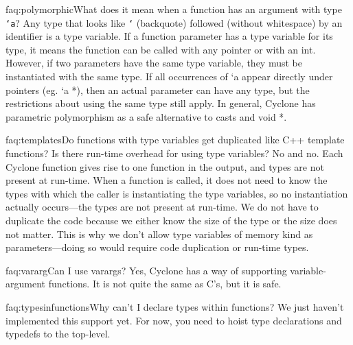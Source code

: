 \begin{faqa}{faq:polymorphic}{What does it mean when a function has an argument with type \texttt{`a}?}
Any type that looks like \texttt{`} (backquote) followed (without
whitespace) by an identifier is a type variable.  If a function
parameter has a type variable for its type, it means the function can
be called with any pointer or with an int.  However, if two parameters
have the same type variable, they must be instantiated with the same
type. If all occurrences of `a appear directly under pointers (eg. `a
*), then an actual parameter can have any type, but the restrictions
about using the same type still apply.  In general, Cyclone has
parametric polymorphism as a safe alternative to casts and void *.
\end{faqa}

\begin{faqa}{faq:templates}{Do functions with type variables get duplicated like C++ template functions?  Is there run-time overhead for using type variables?}
No and no.  Each Cyclone function gives rise to one function in the
output, and types are not present at run-time.  When a function is
called, it does not need to know the types with which the caller is
instantiating the type variables, so no instantiation actually
occurs---the types are not present at run-time.  We do not have to
duplicate the code because we either know the size of the type or the
size does not matter.  This is why we don't allow type variables of
memory kind as parameters---doing so would require code duplication or
run-time types.
\end{faqa}

\begin{faqa}{faq:vararg}{Can I use varargs?}
Yes, Cyclone has a way of supporting variable-argument functions.  It
is not quite the same as C's, but it is safe.
\end{faqa}

\begin{faqa}{faq:typesinfunctions}{Why can't I declare types within functions?}
We just haven't implemented this support yet.  For now, you need to
hoist type declarations and typedefs to the top-level.
\end{faqa}

